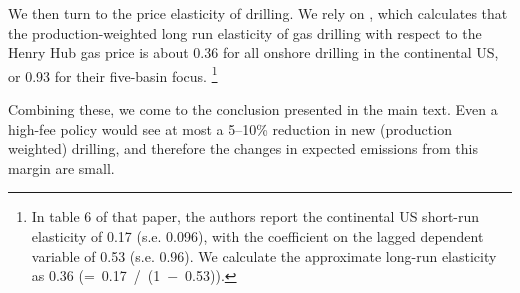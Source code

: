 \documentclass[12pt,oneside,letterpaper]{article}
\theoremstyle{definition}
\begin{document}
\begin{refsection}
We then turn to the price elasticity of drilling.
We rely on \textcite{Gilbert/Roberts:2020}, which calculates that the production-weighted long run elasticity of gas drilling with respect to the Henry Hub gas price is about 0.36 for all onshore drilling in the continental US, or 0.93 for their five-basin focus.
\footnote{%
In table 6 of that paper, the authors report the continental US short-run elasticity of 0.17 (s.e. 0.096), with the coefficient on the lagged dependent variable of 0.53 (s.e. 0.96).
We calculate the approximate long-run elasticity as 0.36 (\hbox{= 0.17 / (1 $-$ 0.53)}).
}

Combining these, we come to the conclusion presented in the main text.
Even a high-fee policy would see at most a 5--10\% reduction in new (production weighted) drilling, and therefore the changes in expected emissions from this margin are small.

\end{refsection}

\newpage

\begin{refsection}
\singlespacing
\twocolumn
\nocite{*}
\printbibliography[heading=subbibliography, title={Software Citations}]
\end{refsection}
\end{document}
